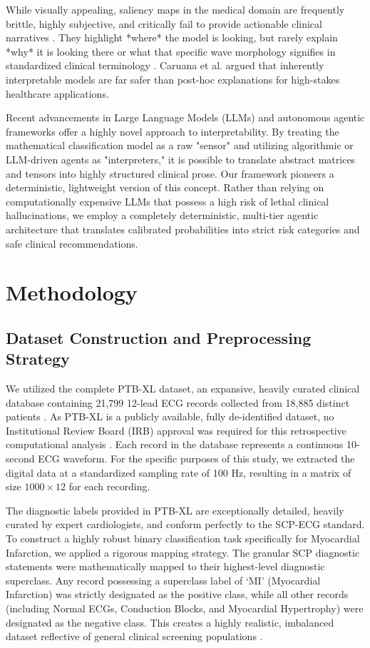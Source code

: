 \documentclass[10pt,twocolumn,letterpaper]{article}
\begin{document}
While visually appealing, saliency maps in the medical domain are frequently brittle, highly subjective, and critically fail to provide actionable clinical narratives \cite{ghassemi2021false}. They highlight *where* the model is looking, but rarely explain *why* it is looking there or what that specific wave morphology signifies in standardized clinical terminology \cite{doshi2017towards}. Caruana et al. \cite{caruana2015intelligible} argued that inherently interpretable models are far safer than post-hoc explanations for high-stakes healthcare applications. 

Recent advancements in Large Language Models (LLMs) and autonomous agentic frameworks offer a highly novel approach to interpretability. By treating the mathematical classification model as a raw "sensor" and utilizing algorithmic or LLM-driven agents as "interpreters," it is possible to translate abstract matrices and tensors into highly structured clinical prose. Our framework pioneers a deterministic, lightweight version of this concept. Rather than relying on computationally expensive LLMs that possess a high risk of lethal clinical hallucinations, we employ a completely deterministic, multi-tier agentic architecture that translates calibrated probabilities into strict risk categories and safe clinical recommendations.

\section{Methodology}

\subsection{Dataset Construction and Preprocessing Strategy}
We utilized the complete PTB-XL dataset, an expansive, heavily curated clinical database containing 21,799 12-lead ECG records collected from 18,885 distinct patients \cite{wagner2020ptb}. As PTB-XL is a publicly available, fully de-identified dataset, no Institutional Review Board (IRB) approval was required for this retrospective computational analysis \cite{vayena2018machine}. Each record in the database represents a continuous 10-second ECG waveform. For the specific purposes of this study, we extracted the digital data at a standardized sampling rate of 100 Hz, resulting in a matrix of size $1000 \times 12$ for each recording. 

The diagnostic labels provided in PTB-XL are exceptionally detailed, heavily curated by expert cardiologists, and conform perfectly to the SCP-ECG standard. To construct a highly robust binary classification task specifically for Myocardial Infarction, we applied a rigorous mapping strategy. The granular SCP diagnostic statements were mathematically mapped to their highest-level diagnostic superclass. Any record possessing a superclass label of `MI' (Myocardial Infarction) was strictly designated as the positive class, while all other records (including Normal ECGs, Conduction Blocks, and Myocardial Hypertrophy) were designated as the negative class. This creates a highly realistic, imbalanced dataset reflective of general clinical screening populations \cite{smets2021evaluation}.
\end{document}
